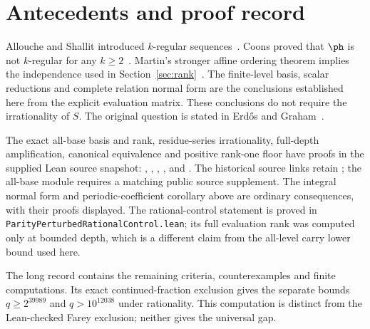 \section{Antecedents and proof record}\label{sec:open}
Allouche and Shallit introduced $k$-regular sequences~\cite{allouche-shallit}.
Coons proved that $\ph$ is not $k$-regular for any $k\ge2$~\cite{coons}.
Martin's stronger affine ordering theorem implies the independence used in
Section~\ref{sec:rank}~\cite{martin-phi-inequalities}. The finite-level basis,
scalar reductions and complete relation normal form are the conclusions
established here from the explicit evaluation matrix. These conclusions do
not require the irrationality of $S$. The original question is stated in
Erd\H{o}s and Graham~\cite[p.~61]{erdosgraham1980}.

The exact all-base basis and rank, residue-series irrationality, full-depth
amplification, canonical equivalence and positive rank-one floor have
proofs in the supplied Lean source snapshot:
,
,
,
, and
.
The historical source links retain \texttt{\commitshort}; the all-base
module requires a matching public source supplement.
The integral normal form and periodic-coefficient corollary above are ordinary
consequences, with their proofs displayed. The rational-control statement is
proved in \texttt{ParityPerturbedRationalControl.lean}; its full evaluation
rank was computed only at bounded depth, which is a different claim from the
all-level carry lower bound used here.

The long record contains the remaining criteria, counterexamples and finite
computations. Its exact continued-fraction exclusion gives the separate
bounds $q\ge2^{39989}$ and $q>10^{12038}$ under rationality. This computation
is distinct from the Lean-checked Farey exclusion; neither gives the universal gap.
